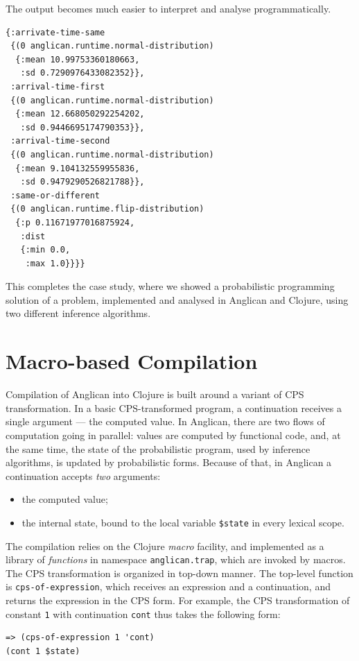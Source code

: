 \documentclass[preprint]{sigplanconf}
\begin{document}
The output becomes much easier to interpret and analyse
programmatically.

\begin{lstlisting}[style=default]
{:arrivate-time-same
 {(0 anglican.runtime.normal-distribution)
  {:mean 10.99753360180663,
   :sd 0.7290976433082352}},
 :arrival-time-first
 {(0 anglican.runtime.normal-distribution)
  {:mean 12.668050292254202,
   :sd 0.9446695174790353}},
 :arrival-time-second
 {(0 anglican.runtime.normal-distribution)
  {:mean 9.104132559955836,
   :sd 0.9479290526821788}},
 :same-or-different
 {(0 anglican.runtime.flip-distribution)
  {:p 0.11671977016875924,
   :dist
   {:min 0.0,
    :max 1.0}}}}
\end{lstlisting}

This completes the case study, where we showed a probabilistic
programming solution of a problem, implemented and analysed in
Anglican and Clojure, using two different inference algorithms.

\section{Macro-based Compilation}
\label{sec:compilation}

Compilation of Anglican into Clojure is built around a variant of CPS
transformation. In a basic CPS-transformed program, a
continuation receives a single argument --- the computed value.
In Anglican, there are two flows of computation going in
parallel: values are computed by functional code, and,
at the same time, the state of the probabilistic program,
used by inference algorithms, is updated by
probabilistic forms. Because of that, in Anglican a continuation
accepts  \textit{two} arguments:
\begin{itemize}
    \item the computed value;
    \item the internal state, bound to the local variable
        \texttt{\$state} in every lexical scope.
\end{itemize}

The compilation relies on the Clojure \textit{macro} facility,
and implemented as a library of \textit{functions} in namespace
\texttt{anglican.trap}, which are invoked by macros.  The CPS
transformation is organized in top-down manner.  The top-level
function is  \texttt{cps-of-expression}, which receives an
expression and a continuation, and returns the expression in the
CPS form. For example, the CPS transformation of constant
\texttt{1} with continuation \texttt{cont} thus takes the
following form:
\begin{lstlisting}[style=default]
=> (cps-of-expression 1 'cont)
(cont 1 $state)
\end{lstlisting}
\end{document}
